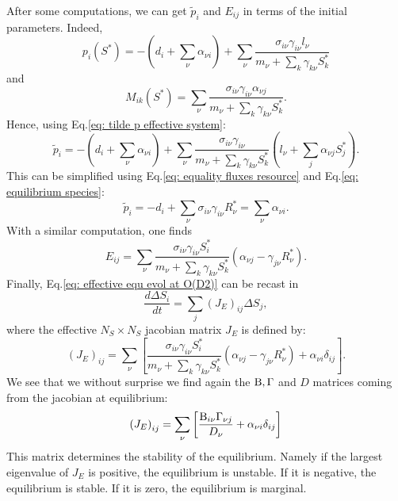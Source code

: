\documentclass[12pt, titlepage, twoside, openright]{report}
\begin{document}
After some computations, we can get $\tilde{p}_i$ and $E_{ij}$ in terms of the initial parameters. Indeed,
\begin{equation}
p_i(S^*)= -\left(d_i + \sum_\nu \alpha_{\nu i}\right) + \sum_\nu \frac{\sigma_{i\nu}\gamma_{i\nu}l_\nu}{m_\nu + \sum_k \gamma_{k\nu}S^*_k}
\end{equation}
and
\begin{equation}
M_{ik}(S^*) = \sum_\nu \frac{\sigma_{i\nu}\gamma_{i\nu}\alpha_{\nu j}}{m_\nu + \sum_k \gamma_{k\nu}S^*_k}.
\end{equation}
Hence, using Eq.\eqref{eq: tilde p effective system}:
\begin{equation}
\tilde{p}_i = - \left(d_i + \sum_\nu \alpha_{\nu i}\right) + \sum_\nu \frac{\sigma_{i\nu}\gamma_{i\nu}}{m_\nu + \sum_k \gamma_{k\nu}S^*_k}\left(l_\nu+\sum_{j}\alpha_{\nu j} S^*_j\right).
\end{equation}
This can be simplified using Eq.\eqref{eq: equality fluxes resource} and Eq.\eqref{eq: equilibrium species}:
\begin{equation}
\tilde{p}_i=-d_i +\sum_\nu \sigma_{i\nu}\gamma_{i\nu}R^*_\nu = \sum_\nu \alpha_{\nu i}.
\end{equation}
With a similar computation, one finds
\begin{equation}
E_{ij}=\sum_\nu \frac{\sigma_{i\nu}\gamma_{i\nu}S^*_i}{m_\nu+\sum_k \gamma_{k\nu}S^*_k} \left(\alpha_{\nu j}-\gamma_{j\nu}R^*_\nu\right).
\end{equation}
Finally, Eq.\eqref{eq: effective equ evol at O(D2)} can be recast in
\begin{equation}
\frac{d\Delta S_i}{dt} = \sum_j (J_E)_{ij} \Delta S_j,
\end{equation}
where the effective $N_S\times N_S$ jacobian matrix $J_E$ is defined by:
\begin{equation}
(J_E)_{ij}=\sum_\nu \left[\frac{\sigma_{i\nu}\gamma_{i\nu}S^*_i}{m_\nu+\sum_k \gamma_{k\nu}S^*_k} \left(\alpha_{\nu j}-\gamma_{j\nu}R^*_\nu\right)+\alpha_{\nu i}\delta_{ij}\right].
\end{equation}
We see that we without surprise we find again the $\text{B}, \Gamma $ and $D$ matrices coming from the jacobian at equilibrium:
\begin{equation}
\left(J_E\right)_{ij}=\sum_\nu \left[\frac{\text{B}_{i\nu}\Gamma_{\nu j}}{D_\nu}+\alpha_{\nu i} \delta_{ij}\right]
\end{equation}
This matrix determines the stability of the equilibrium. Namely if the largest eigenvalue of $J_E$ is positive, the equilibrium is unstable. If it is negative, the equilibrium is stable. If it is zero, the equilibrium is marginal.
\end{document}
